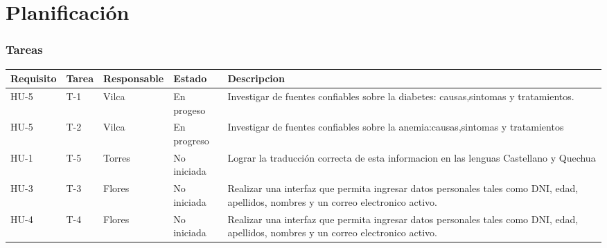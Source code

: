 \chapter{Planificación}

\subsection{Tareas}
\begin{table}[htbp]
	\begin{center}
		\begin{tabular}{| p{1.8cm}| p{1.2cm}| p{2.4cm}|p{2.2cm} |p{7.8cm} |}
	\hline
	\textbf{Requisito} & \textbf{Tarea} & \textbf {Responsable}& \textbf{Estado} & \textbf{Descripcion}
	\\\hline  
	HU-5&T-1&Vilca&En progeso&Investigar de fuentes confiables sobre la diabetes: causas,sintomas y tratamientos.
	 \\ \hline
	HU-5&T-2&Vilca&En progreso&Investigar de fuentes confiables sobre la anemia:causas,sintomas y tratamientos
	 \\ \hline
	HU-1&T-5&Torres&No iniciada&Lograr la traducción correcta de esta informacion en las lenguas Castellano y Quechua
	 \\ \hline
	HU-3&T-3&Flores&No iniciada&Realizar una interfaz que permita ingresar datos personales tales como DNI, edad, apellidos, nombres y un correo electronico activo.
	 \\ \hline
	HU-4&T-4&Flores&No iniciada&Realizar una interfaz que permita ingresar datos personales tales como DNI, edad, apellidos, nombres y un correo electronico activo.
	 \\ \hline
		\end{tabular}
\end{center}
\end{table}

